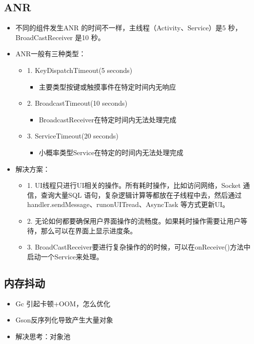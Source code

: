 \documentclass[9pt, b5paper]{article}
\begin{document}
\subsection{ANR}
\label{sec-1-4}
\begin{itemize}
\item 不同的组件发生ANR 的时间不一样，主线程（Activity、Service）是5 秒，BroadCastReceiver 是10 秒。
\item ANR一般有三种类型：
\begin{itemize}
\item 1. KeyDispatchTimeout(5 seconds)
\begin{itemize}
\item 主要类型按键或触摸事件在特定时间内无响应
\end{itemize}
\item 2. BroadcastTimeout(10 seconds)
\begin{itemize}
\item BroadcastReceiver在特定时间内无法处理完成
\end{itemize}
\item 3. ServiceTimeout(20 seconds)
\begin{itemize}
\item 小概率类型Service在特定的时间内无法处理完成
\end{itemize}
\end{itemize}
\item 解决方案：
\begin{itemize}
\item 1. UI线程只进行UI相关的操作。所有耗时操作，比如访问网络，Socket 通信，查询大量SQL 语句，复杂逻辑计算等都放在子线程中去，然后通过handler.sendMessage、runonUITread、AsyncTask 等方式更新UI。
\item 2. 无论如何都要确保用户界面操作的流畅度。如果耗时操作需要让用户等待，那么可以在界面上显示进度条。
\item 3. BroadCastReceiver要进行复杂操作的的时候，可以在onReceive()方法中启动一个Service来处理。
\end{itemize}
\end{itemize}
\subsection{内存抖动}
\label{sec-1-5}
\begin{itemize}
\item Gc 引起卡顿+OOM，怎么优化
\item Gson反序列化导致产生大量对象
\item 解决思考：对象池
\end{itemize}
\end{document}
